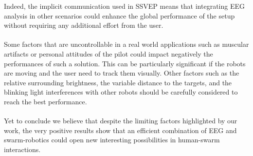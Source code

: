 \documentclass[smallextended]{svjour3}
\begin{document}
Indeed, the implicit communication used in SSVEP means that integrating EEG analysis in other scenarios could enhance the global performance of the setup without requiring any additional effort from the user.\\
\\
Some factors that are uncontrollable in a real world applications such as muscular artifacts or personal attitudes of the pilot could impact negatively the performances of such a solution.
This can be particularly significant if the robots are moving and the user need to track them visually. 
Other factors such as the relative surrounding brightness, the variable distance to the targets, and the blinking light interferences with other robots should be carefully considered to reach the best performance. \\
\\
Yet to conclude we believe that despite the limiting factors highlighted by our work, the very positive results show that an efficient combination of EEG and swarm-robotics could open new interesting possibilities in human-swarm interactions.\\

\iffalse
\end{document}
